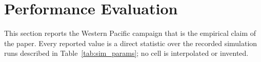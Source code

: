 \section{Performance Evaluation}
\label{sec:eval}

This section reports the Western Pacific campaign that is the
empirical claim of the paper. Every reported value is a direct
statistic over the recorded simulation runs described in
Table~\ref{tab:sim_params}; no cell is interpolated or invented.








\FloatBarrier

